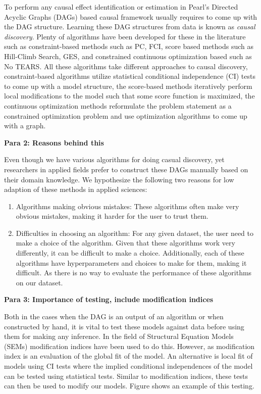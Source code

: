 \documentclass{article}
\begin{document}
To perform any causal effect identification or estimation in Pearl's Directed
Acyclic Graphs (DAGs) based causal framework usually requires to come up with
the DAG structure. Learning these DAG structures from data is known as
\emph{causal discovery}. Plenty of algorithms have been developed for these in
the literature such as constraint-based methods such as PC, FCI, score based
methods such as Hill-Climb Search, GES, and constrained continuous optimization
based such as No TEARS. All these algorithms take different approaches to
causal discovery, constraint-based algorithms utilize statistical conditional
independence (CI) tests to come up with a model structure, the score-based
methods iteratively perform local modifications to the model such that some
score function is maximized, the continuous optimization methods reformulate
the problem statement as a constrained optimization problem and use
optimization algorithms to come up with a graph.

\textbf{Para 2: Reasons behind this}

Even though we have various algorithms for doing casual discovery, yet
researchers in applied fields prefer to construct these DAGs manually based on
their domain knowledge. We hypothesize the following two reasons for low
adaption of these methods in applied sciences:

\begin{enumerate}
	\item Algorithms making obvious mistakes: These algorithms often 
		make very obvious mistakes, making it harder for the user
		to trust them.
	\item Difficulties in choosing an algorithm: For any given dataset, the
		user need to make a choice of the algorithm. Given that these
		algorithms work very differently, it can be difficult to make a
		choice. Additionally, each of these algorithms have
		hyperparameters and choices to make for them, making it
		difficult. As there is no way to evaluate the performance of 
		these algorithms on our dataset.
\end{enumerate}

\textbf{Para 3: Importance of testing, include modification indices}

Both in the cases when the DAG is an output of an algorithm or when constructed
by hand, it is vital to test these models against data before using them for
making any inference. In the field of Structural Equation Models (SEMs)
modification indices have been used to do this. However, as modification index
is an evaluation of the global fit of the model. An alternative is local fit of
models using CI tests where the implied conditional independences of the model
can be tested using statistical tests. Similar to modification indices, these
tests can then be used to modify our models. Figure shows an example of this
testing.
\end{document}
